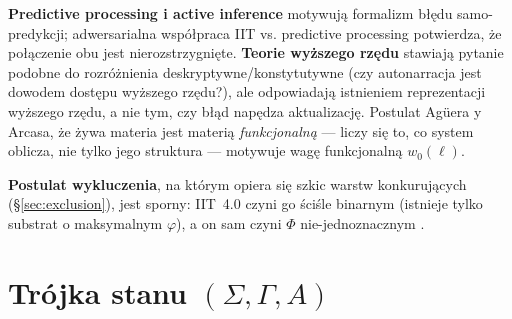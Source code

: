\documentclass[11pt]{article}
\begin{document}
\textbf{Predictive processing i active inference} \cite{friston2010,deane2021} motywują formalizm błędu samo-predykcji; adwersarialna współpraca IIT vs. predictive processing \cite{intrepid2026} potwierdza, że połączenie obu jest nierozstrzygnięte. \textbf{Teorie wyższego rzędu} \cite{rosenthal2005} stawiają pytanie podobne do rozróżnienia deskryptywne/konstytutywne (czy autonarracja jest dowodem dostępu wyższego rzędu?), ale odpowiadają istnieniem reprezentacji wyższego rzędu, a nie tym, czy błąd napędza aktualizację. Postulat Ag\"uera y Arcasa, że żywa materia jest materią \emph{funkcjonalną} --- liczy się to, co system oblicza, nie tylko jego struktura --- motywuje wagę funkcjonalną $w_0(\ell)$.

\textbf{Postulat wykluczenia}, na którym opiera się szkic warstw konkurujących (\S\ref{sec:exclusion}), jest sporny: IIT~4.0 \cite{albantakis2023} czyni go ściśle binarnym (istnieje tylko substrat o maksymalnym $\varphi$), a on sam czyni $\Phi$ nie-jednoznacznym \cite{hanson2023}.

\section{Trójka stanu $(\Sigma,\Gamma,A)$}
\end{document}
